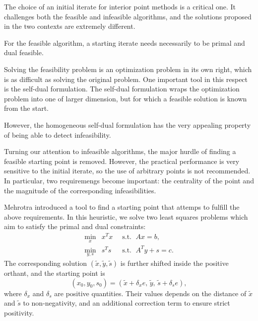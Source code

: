 The choice of an initial iterate for interior point methods is a
critical one. It challenges both the feasible and infeasible
algorithms, and the solutions proposed in the two contexts are
extremely different.

For the feasible algorithm, a starting iterate needs necessarily 
to be primal and dual feasible.

Solving the feasibility problem is an optimization problem in its
own right, which is as difficult as solving the original problem.
One important tool in this respect is the self-dual formulation.
The self-dual formulation wraps the optimization problem into one 
of larger dimension, but for which a feasible solution is known 
from the start.


However, the homogeneous self-dual formulation has the very
appealing property of being able to detect infeasibility.

Turning our attention to infeasible algorithms, the major hurdle
of finding a feasible starting point is removed. 
However, the practical performance is very sensitive to the initial
iterate, so the use of arbitrary points is not recommended.
In particular, two requiremengs become important: the centrality 
of the point and the magnitude of the corresponding infeasibilities.

Mehrotra \cite{Mehrotra92} introduced a tool to find a starting point 
that attemps to fulfill the above requirements. In this
heuristic, we solve two least squares problems which aim to
satisfy the primal and dual constraints:
\begin{eqnarray*}
  \min_x    \!\! & x^Tx & \;\;\mbox{s.t. }\; Ax = b,      \\
  \min_{y,s}\!\! & s^Ts & \;\;\mbox{s.t. }\; A^Ty + s = c.
\end{eqnarray*}
The corresponding solution $(\tilde x, \tilde y, \tilde s)$ is further 
shifted inside the positive orthant, and the starting point is
\[
(x_0,y_0,s_0) = (\tilde x + \delta_x e,\, \tilde y,\, \tilde s + \delta_s e),
\]
where $\delta_x$ and $\delta_s$ are positive quantities. 
Their values depends on the distance of $\tilde x$ and $\tilde s$
to non-negativity, and an additional correction term to ensure
strict positivity.

